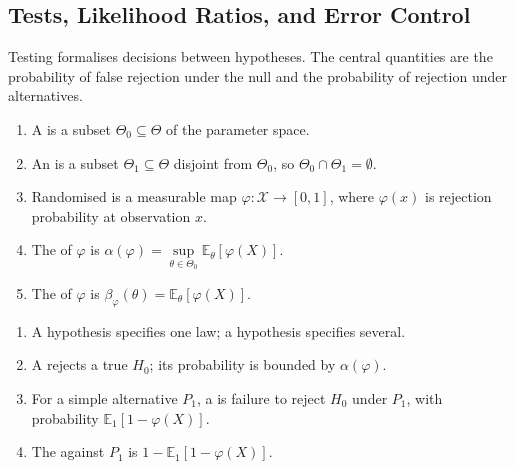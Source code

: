 \subsection{Tests, Likelihood Ratios, and Error Control}

Testing formalises decisions between hypotheses.  The central quantities are the probability of false rejection under the null and the probability of rejection under alternatives.

\begin{definition} \label{def:hypotheses-tests-size-power} 
\begin{enumerate}[label=(\roman*)]
\setlength{\itemsep}{0pt}
\item A  is a subset $\Theta_0\subseteq\Theta$ of the parameter space.
\item An  is a subset $\Theta_1\subseteq\Theta$ disjoint from $\Theta_0$, so $\Theta_0\cap\Theta_1=\emptyset$.
\item Randomised  is a measurable map $\varphi:\mathcal{X}\to[0,1]$, where $\varphi(x)$ is rejection probability at observation $x$.
\item The  of $\varphi$ is $\alpha(\varphi)=\sup\limits_{\theta\in\Theta_0}\mathbb{E}_\theta[\varphi(X)]$.
\item The  of $\varphi$ is $\beta_\varphi(\theta)=\mathbb{E}_\theta[\varphi(X)]$.
\end{enumerate}
\end{definition}

\begin{definition} \label{def:simple-composite-type-errors} 
\begin{enumerate}[label=(\roman*)]
\setlength{\itemsep}{0pt}
\item A  hypothesis specifies one law; a  hypothesis specifies several.
\item A  rejects a true $H_0$; its probability is bounded by $\alpha(\varphi)$.
\item For a simple alternative $P_1$, a  is failure to reject $H_0$ under $P_1$, with probability $\mathbb{E}_1[1-\varphi(X)]$.
\item The  against $P_1$ is $1-\mathbb{E}_1[1-\varphi(X)]$.
\end{enumerate}
\end{definition}

